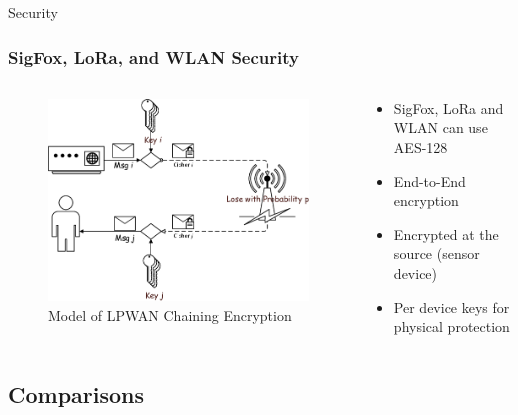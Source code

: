 \documentclass{beamer}
\begin{document}
  \begin{frame}{Security}
    \frametitle{SigFox, LoRa, and WLAN Security}
    \begin{columns}
      \begin{column}{0.5\textwidth}
        \begin{figure}[htbp]
          \centering
          \includegraphics[width=\textwidth]{Model-of-LPWAN-Chaining-Encryption.png}
          \caption{Model of LPWAN Chaining Encryption \cite{bidgoly2019novel}}
          \label{fig:LPWAN_encryption}
        \end{figure}
      \end{column}
      \begin{column}{0.5\textwidth}
        \begin{itemize}
          \item SigFox, LoRa and WLAN can use AES-128
          \item End-to-End encryption
          \item Encrypted at the source (sensor device)
          \item Per device keys for physical protection
        \end{itemize}
      \end{column}
    \end{columns}
  \end{frame}

\subsection{Comparisons}
\end{document}
